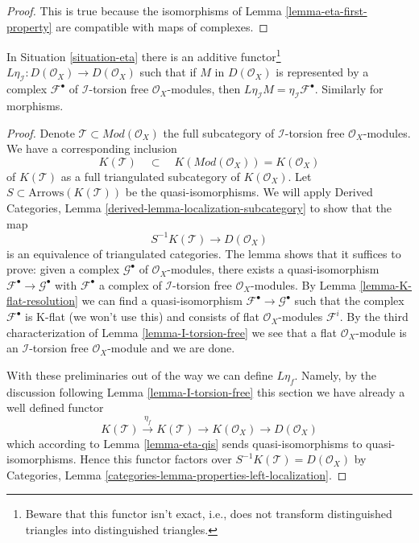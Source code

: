 \begin{proof}
This is true because the isomorphisms of Lemma \ref{lemma-eta-first-property}
are compatible with maps of complexes.
\end{proof}

\begin{lemma}
\label{lemma-Leta}
In Situation \ref{situation-eta} there is an additive
functor\footnote{Beware that this functor isn't exact, i.e.,
does not transform distinguished triangles into distinguished triangles.}
$L\eta_\mathcal{I} : D(\mathcal{O}_X) \to D(\mathcal{O}_X)$
such that if $M$ in $D(\mathcal{O}_X)$ is represented by a complex
$\mathcal{F}^\bullet$ of $\mathcal{I}$-torsion free $\mathcal{O}_X$-modules,
then $L\eta_\mathcal{I}M = \eta_\mathcal{I}\mathcal{F}^\bullet$.
Similarly for morphisms.
\end{lemma}

\begin{proof}
Denote $\mathcal{T} \subset \textit{Mod}(\mathcal{O}_X)$ the full subcategory
of $\mathcal{I}$-torsion free $\mathcal{O}_X$-modules.
We have a corresponding inclusion
$$
K(\mathcal{T})
\quad\subset\quad
K(\textit{Mod}(\mathcal{O}_X)) = K(\mathcal{O}_X)
$$
of $K(\mathcal{T})$ as a full triangulated subcategory of $K(\mathcal{O}_X)$.
Let $S \subset \text{Arrows}(K(\mathcal{T}))$ be the quasi-isomorphisms.
We will apply
Derived Categories, Lemma \ref{derived-lemma-localization-subcategory}
to show that the map
$$
S^{-1}K(\mathcal{T}) \longrightarrow D(\mathcal{O}_X)
$$
is an equivalence of triangulated categories. The lemma shows that
it suffices to prove: given a complex $\mathcal{G}^\bullet$ of
$\mathcal{O}_X$-modules,
there exists a quasi-isomorphism $\mathcal{F}^\bullet \to \mathcal{G}^\bullet$
with $\mathcal{F}^\bullet$
a complex of $\mathcal{I}$-torsion free $\mathcal{O}_X$-modules.
By Lemma \ref{lemma-K-flat-resolution} we can find a quasi-isomorphism
$\mathcal{F}^\bullet \to \mathcal{G}^\bullet$ such that the complex
$\mathcal{F}^\bullet$ is K-flat (we won't use this) and
consists of flat $\mathcal{O}_X$-modules $\mathcal{F}^i$.
By the third characterization of Lemma \ref{lemma-I-torsion-free}
we see that a flat $\mathcal{O}_X$-module is an
$\mathcal{I}$-torsion free $\mathcal{O}_X$-module
and we are done.

\medskip\noindent
With these preliminaries out of the way we can define $L\eta_f$.
Namely, by the discussion following Lemma \ref{lemma-I-torsion-free}
this section we have already a well defined functor
$$
K(\mathcal{T}) \xrightarrow{\eta_f} K(\mathcal{T}) \to
K(\mathcal{O}_X) \to D(\mathcal{O}_X)
$$
which according to Lemma \ref{lemma-eta-qis} sends quasi-isomorphisms
to quasi-isomorphisms. Hence this functor factors over
$S^{-1}K(\mathcal{T}) = D(\mathcal{O}_X)$ by 
Categories, Lemma \ref{categories-lemma-properties-left-localization}.
\end{proof}

